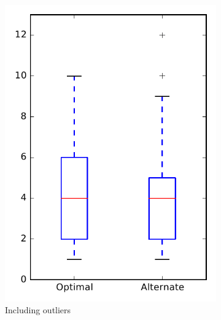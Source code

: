 
\begin{figure}
    \centering
    \begin{subfigure}{.4\textwidth}
        \centering
        \includegraphics[height=0.4\textheight]{figures/combo/dit_rq1_zookeeper}
        \caption{Including outliers}\label{fig:combo:dit:rq1:zookeeper_outlier}
    \end{subfigure}%
    \begin{subfigure}{.4\textwidth}
        \centering

\end{subfigure}
\end{figure}
